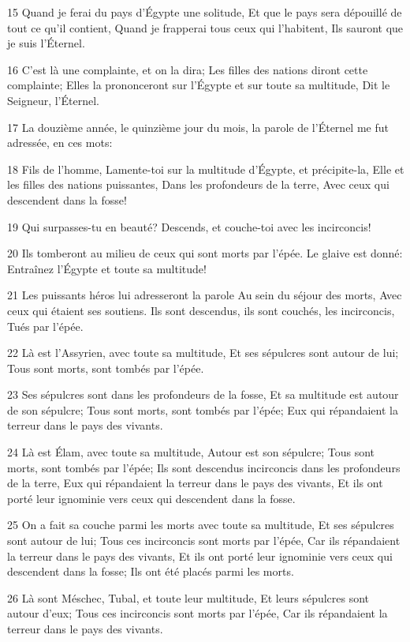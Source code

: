 \par 15 Quand je ferai du pays d'Égypte une solitude, Et que le pays sera dépouillé de tout ce qu'il contient, Quand je frapperai tous ceux qui l'habitent, Ils sauront que je suis l'Éternel.
\par 16 C'est là une complainte, et on la dira; Les filles des nations diront cette complainte; Elles la prononceront sur l'Égypte et sur toute sa multitude, Dit le Seigneur, l'Éternel.
\par 17 La douzième année, le quinzième jour du mois, la parole de l'Éternel me fut adressée, en ces mots:
\par 18 Fils de l'homme, Lamente-toi sur la multitude d'Égypte, et précipite-la, Elle et les filles des nations puissantes, Dans les profondeurs de la terre, Avec ceux qui descendent dans la fosse!
\par 19 Qui surpasses-tu en beauté? Descends, et couche-toi avec les incirconcis!
\par 20 Ils tomberont au milieu de ceux qui sont morts par l'épée. Le glaive est donné: Entraînez l'Égypte et toute sa multitude!
\par 21 Les puissants héros lui adresseront la parole Au sein du séjour des morts, Avec ceux qui étaient ses soutiens. Ils sont descendus, ils sont couchés, les incirconcis, Tués par l'épée.
\par 22 Là est l'Assyrien, avec toute sa multitude, Et ses sépulcres sont autour de lui; Tous sont morts, sont tombés par l'épée.
\par 23 Ses sépulcres sont dans les profondeurs de la fosse, Et sa multitude est autour de son sépulcre; Tous sont morts, sont tombés par l'épée; Eux qui répandaient la terreur dans le pays des vivants.
\par 24 Là est Élam, avec toute sa multitude, Autour est son sépulcre; Tous sont morts, sont tombés par l'épée; Ils sont descendus incirconcis dans les profondeurs de la terre, Eux qui répandaient la terreur dans le pays des vivants, Et ils ont porté leur ignominie vers ceux qui descendent dans la fosse.
\par 25 On a fait sa couche parmi les morts avec toute sa multitude, Et ses sépulcres sont autour de lui; Tous ces incirconcis sont morts par l'épée, Car ils répandaient la terreur dans le pays des vivants, Et ils ont porté leur ignominie vers ceux qui descendent dans la fosse; Ils ont été placés parmi les morts.
\par 26 Là sont Méschec, Tubal, et toute leur multitude, Et leurs sépulcres sont autour d'eux; Tous ces incirconcis sont morts par l'épée, Car ils répandaient la terreur dans le pays des vivants.
